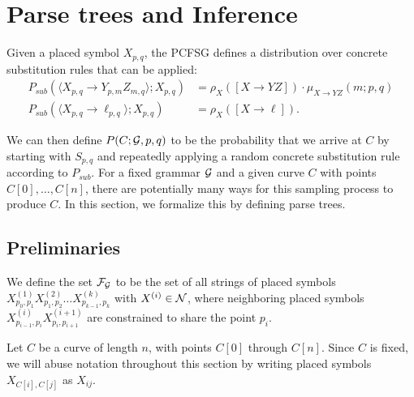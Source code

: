

\def\ind{\mathbf{1}}
\newcommand\Inner{\mathbb{I}}
\newcommand\Outer{\mathbb{O}}
\newcommand\Full{\mathbb{F}}

\section{Parse trees and Inference}

Given a placed symbol $X_{p,q}$, the PCFSG defines a distribution over
concrete substitution rules that can be applied:
\begin{align*}
  P_{sub}( \langle X_{p,q} \to Y_{p,m} Z_{m,q}\rangle ; X_{p,q})
  &= \rho_X([X\to YZ]) \cdot \mu_{X\to YZ}(m; p,q)\\
  P_{sub}( \langle X_{p,q} \to \ell_{p,q} \rangle ; X_{p,q}) 
  &= \rho_X([X\to \ell]).
\end{align*}

We can then define $P(C; {\mathcal G}, p,q)$ to be the probability that we
arrive at $C$ by starting with $S_{p,q}$ and repeatedly applying a
random concrete substitution rule according to $P_{sub}$. For a fixed
grammar ${\mathcal G}$ and a given curve $C$ with points $C[0], \dots, C[n]$,
there are potentially many ways for this sampling process to produce
$C$. In this section, we formalize this by defining parse trees.

\subsection{Preliminaries}

\begin{defn}
We define the set ${\mathcal F}_{{\mathcal G}}$ to be the set of all strings of placed
symbols $X^{(1)}_{p_0,p_1} X^{(2)}_{p_1,p_2} \dots X^{(k)}_{p_{k-1},
  p_k}$ with $X^{(i)} \in {\mathcal N}$, where neighboring placed symbols
$X^{(i)}_{p_{i-1},p_i} X^{(i+1)}_{p_i,p_{i+1}}$ are constrained to
share the point $p_i$.
\end{defn}

Let $C$ be a curve of length $n$, with points $C[0]$ through
$C[n]$. Since $C$ is fixed, we will abuse notation throughout this
section by writing placed symbols $X_{C[i],C[j]}$ as $X_{ij}$.

